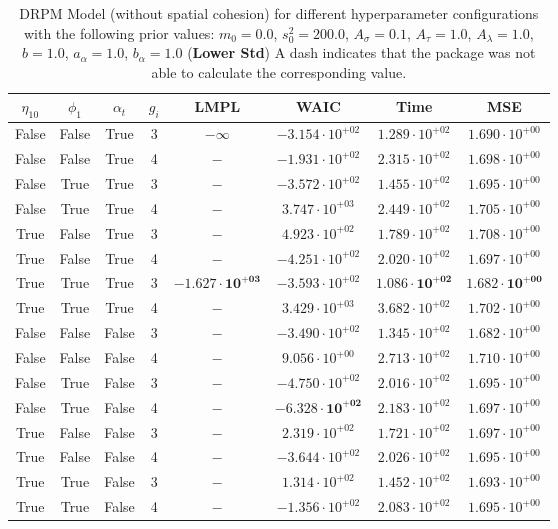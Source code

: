 \documentclass[12pt,a4paper]{article}
\begin{document}
\begin{table}
\caption{DRPM Model (without spatial cohesion) for different hyperparameter configurations with the following prior values: $m_0 = 0.0$, $s_0^2 
= 200.0$, $A_\sigma = 0.1$, $A_\tau = 1.0$, $A_\lambda = 1.0$, $b = 1.0$, $a_\alpha = 1.0$, $b_\alpha = 1.0$ (\textbf{Lower Std})
A dash indicates that the package was not able to calculate the corresponding value.}
\centering\begin{tabular}{cccccccc}
\toprule
$\eta_{10}$ & $\phi_1$ & $\alpha_t$ & $g_i$ & LMPL & WAIC & Time & MSE \\
\midrule
False & False & True & 3 & $-\infty$ & $-3.154 \cdot 10^{+02}$ & $1.289 \cdot 10^{+02}$ & $1.690 \cdot 10^{+00}$ \\
False & False & True & 4 & $-$ & $-1.931 \cdot 10^{+02}$ & $2.315 \cdot 10^{+02}$ & $1.698 \cdot 10^{+00}$ \\
False & True & True & 3 & $-$ & $-3.572 \cdot 10^{+02}$ & $1.455 \cdot 10^{+02}$ & $1.695 \cdot 10^{+00}$ \\
False & True & True & 4 & $-$ & $3.747 \cdot 10^{+03}$ & $2.449 \cdot 10^{+02}$ & $1.705 \cdot 10^{+00}$ \\
True & False & True & 3 & $-$ & $4.923 \cdot 10^{+02}$ & $1.789 \cdot 10^{+02}$ & $1.708 \cdot 10^{+00}$ \\
True & False & True & 4 & $-$ & $-4.251 \cdot 10^{+02}$ & $2.020 \cdot 10^{+02}$ & $1.697 \cdot 10^{+00}$ \\
True & True & True & 3 & $\mathbf{-1.627 \cdot 10^{+03}}$ & $-3.593 \cdot 10^{+02}$ & $\mathbf{1.086 \cdot 10^{+02}}$ & $\mathbf{1.682 \cdot 10^{+00}}$ \\
True & True & True & 4 & $-$ & $3.429 \cdot 10^{+03}$ & $3.682 \cdot 10^{+02}$ & $1.702 \cdot 10^{+00}$ \\
False & False & False & 3 & $-$ & $-3.490 \cdot 10^{+02}$ & $1.345 \cdot 10^{+02}$ & $1.682 \cdot 10^{+00}$ \\
False & False & False & 4 & $-$ & $9.056 \cdot 10^{+00}$ & $2.713 \cdot 10^{+02}$ & $1.710 \cdot 10^{+00}$ \\
False & True & False & 3 & $-$ & $-4.750 \cdot 10^{+02}$ & $2.016 \cdot 10^{+02}$ & $1.695 \cdot 10^{+00}$ \\
False & True & False & 4 & $-$ & $\mathbf{-6.328 \cdot 10^{+02}}$ & $2.183 \cdot 10^{+02}$ & $1.697 \cdot 10^{+00}$ \\
True & False & False & 3 & $-$ & $2.319 \cdot 10^{+02}$ & $1.721 \cdot 10^{+02}$ & $1.697 \cdot 10^{+00}$ \\
True & False & False & 4 & $-$ & $-3.644 \cdot 10^{+02}$ & $2.026 \cdot 10^{+02}$ & $1.695 \cdot 10^{+00}$ \\
True & True & False & 3 & $-$ & $1.314 \cdot 10^{+02}$ & $1.452 \cdot 10^{+02}$ & $1.693 \cdot 10^{+00}$ \\
True & True & False & 4 & $-$ & $-1.356 \cdot 10^{+02}$ & $2.083 \cdot 10^{+02}$ & $1.695 \cdot 10^{+00}$ \\
\bottomrule
\end{tabular}
\end{table}
\end{document}
